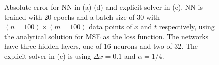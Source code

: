\documentclass[a4paper,10pt,english]{article}
\begin{document}
\begin{figure}
\caption{Absolute error for NN in (a)-(d) and explicit solver in (e). NN is
trained with 20 epochs and a batch size of 30 with $(n=100)\times (m=100)$
data points of $x$
and $t$ respectively, using the analytical solution for MSE as the loss
function. The networks have three hidden layers, one of 16 neurons and two of 32.
The explicit solver in (e) is using $\Delta x=0.1$ and $\alpha=1/4$.}
\label{fig:abs_error_all}
\end{figure}
\end{document}
